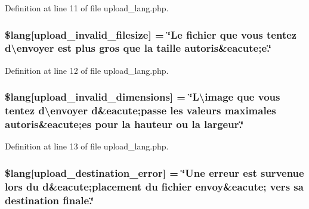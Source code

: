 Definition at line 11 of file upload\+\_\+lang.\+php.

\subsubsection[{\texorpdfstring{\$lang}{$lang}}]{\setlength{\rightskip}{0pt plus 5cm}\$lang\mbox{[}\textquotesingle{}upload\+\_\+invalid\+\_\+filesize\textquotesingle{}\mbox{]} = \char`\"{}Le fichier que vous tentez d\textbackslash{}\textquotesingle{}envoyer est plus gros que la taille autoris\&eacute;e.\char`\"{}}\hypertarget{application_2language_2french_2upload__lang_8php_a832b3ec1d84b1d48a488cf525954d8f2}{}\label{application_2language_2french_2upload__lang_8php_a832b3ec1d84b1d48a488cf525954d8f2}


Definition at line 12 of file upload\+\_\+lang.\+php.

\subsubsection[{\texorpdfstring{\$lang}{$lang}}]{\setlength{\rightskip}{0pt plus 5cm}\$lang\mbox{[}\textquotesingle{}upload\+\_\+invalid\+\_\+dimensions\textquotesingle{}\mbox{]} = \char`\"{}L\textbackslash{}\textquotesingle{}image que vous tentez d\textbackslash{}\textquotesingle{}envoyer {\bf d}\&eacute;passe les valeurs maximales autoris\&eacute;es pour la hauteur ou la largeur.\char`\"{}}\hypertarget{application_2language_2french_2upload__lang_8php_a4e796eeccf7df90acffea7884a5bd558}{}\label{application_2language_2french_2upload__lang_8php_a4e796eeccf7df90acffea7884a5bd558}


Definition at line 13 of file upload\+\_\+lang.\+php.

\subsubsection[{\texorpdfstring{\$lang}{$lang}}]{\setlength{\rightskip}{0pt plus 5cm}\$lang\mbox{[}\textquotesingle{}upload\+\_\+destination\+\_\+error\textquotesingle{}\mbox{]} = \char`\"{}Une erreur est survenue lors du {\bf d}\&eacute;placement du fichier envoy\&eacute; vers sa destination finale.\char`\"{}}\hypertarget{application_2language_2french_2upload__lang_8php_a31be70c748b9bfc43dd7468e1fa64c42}{}\label{application_2language_2french_2upload__lang_8php_a31be70c748b9bfc43dd7468e1fa64c42}


